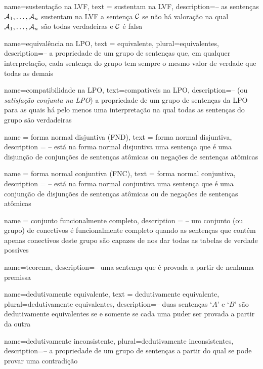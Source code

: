 {
 name=sustentação na LVF,
 text = sustentam na LVF,
 description={-- as sentenças $\mathcal{A}_1, \ldots, \mathcal{A}_n$ sustentam na LVF a sentença $\mathcal{C}$ se não há valoração na qual $\mathcal{A}_1, \ldots, \mathcal{A}_n$ são todas verdadeiras e $\mathcal{C}$ é falsa}
}

{
 name=equivalência na LPO,
 text = equivalente,
 plural=equivalentes,
 description={-- a propriedade de um grupo de sentenças que, em qualquer interpretação, cada sentença do grupo tem sempre o mesmo valor de verdade que todas as demais}
}

{
 name=compatibilidade na LPO,
 text=compatíveis na LPO,
 description={-- (ou \textit{satisfação conjunta na LPO}) a propriedade de um grupo de sentenças da LPO para as quais há pelo menos uma interpretação na qual todas as sentenças do grupo são verdadeiras}
}

{
 name = forma normal disjuntiva (FND),
 text = forma normal disjuntiva,
 description = {-- está na forma normal disjuntiva uma sentença que é uma disjunção de conjunções de sentenças atômicas ou negações de sentenças atômicas}
}

{
 name = forma normal conjuntiva (FNC),
 text = forma normal conjuntiva,
 description = {-- está na forma normal conjuntiva uma sentença que é uma conjunção de disjunções de sentenças atômicas ou de negações de sentenças atômicas}
}

{
 name = conjunto funcionalmente completo,
 description = {-- um conjunto (ou grupo) de conectivos é funcionalmente completo quando as sentenças que contém apenas conectivos deste grupo são capazes de nos dar todas as tabelas de verdade possíves}
}

{
 name=teorema,
 description={-- uma sentença que é provada a partir de nenhuma premissa}
}

{
 name=dedutivamente equivalente,
 text = dedutivamente equivalente,
 plural=dedutivamente equivalentes,
 description={-- duas sentenças `$A$' e `$B$' são  dedutivamente equivalentes se e somente se cada uma puder ser provada a partir da outra}
}

{
 name={dedutivamente inconsistente}, 
 plural={dedutivamente inconsistentes},
 description={-- a propriedade de um grupo de sentenças a partir do qual se pode provar uma contradição}
}

